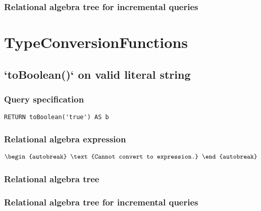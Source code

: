 
\subsubsection*{Relational algebra tree for incremental queries}

\section{TypeConversionFunctions}


\subsection{`toBoolean()` on valid literal string}

\subsubsection*{Query specification}

\begin{lstlisting}
RETURN toBoolean('true') AS b
\end{lstlisting}

\subsubsection*{Relational algebra expression}

\begin{align*}
\begin{autobreak}
\text{Cannot convert to expression.}
\end{autobreak}
\end{align*}

\subsubsection*{Relational algebra tree}


\subsubsection*{Relational algebra tree for incremental queries}


